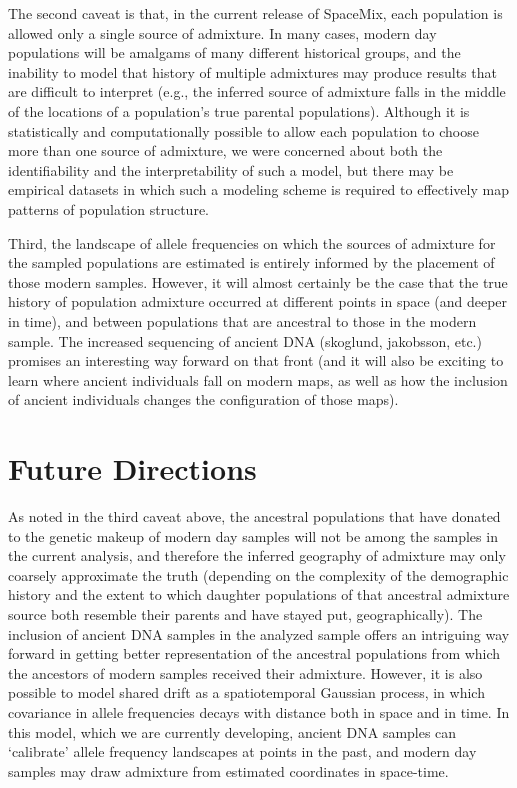 \documentclass[12pt]{article}
\begin{document}
The second caveat is that, in the current release of SpaceMix, each population is allowed only a single source of admixture.  In many cases, modern day populations will be amalgams of many different historical groups, and the inability to model that history of multiple admixtures may produce results that are difficult to interpret (e.g., the inferred source of admixture falls in the middle of the locations of a population's true parental populations).  Although it is statistically and computationally possible to allow each population to choose more than one source of admixture, we were concerned about both the identifiability and the interpretability of such a model, but there may be empirical datasets in which such a modeling scheme is required to effectively map patterns of population structure.

Third, the landscape of allele frequencies on which the sources of admixture for the sampled populations are estimated is entirely informed by the placement of those modern samples.  However, it will almost certainly be the case that the true history of population admixture occurred at different points in space (and deeper in time), and between populations that are ancestral to those in the modern sample.  The increased sequencing of ancient DNA (skoglund, jakobsson, etc.) promises an interesting way forward on that front (and it will also be exciting to learn where ancient individuals fall on modern maps, as well as how the inclusion of ancient individuals changes the configuration of those maps).

\section*{Future Directions}

As noted in the third caveat above, the ancestral populations that have donated to the genetic makeup of modern day samples will not be among the samples in the current analysis, and therefore the inferred geography of admixture may only coarsely approximate the truth (depending on the complexity of the demographic history and the extent to which daughter populations of that ancestral admixture source both resemble their parents and have stayed put, geographically).  The inclusion of ancient DNA samples in the analyzed sample offers an intriguing way forward in getting better representation of the ancestral populations from which the ancestors of modern samples received their admixture.  However, it is also possible to model shared drift as a spatiotemporal Gaussian process, in which covariance in allele frequencies decays with distance both in space and in time.  In this model, which we are currently developing, ancient DNA samples can `calibrate' allele frequency landscapes at points in the past, and modern day samples may draw admixture from estimated coordinates in space-time.
\end{document}
